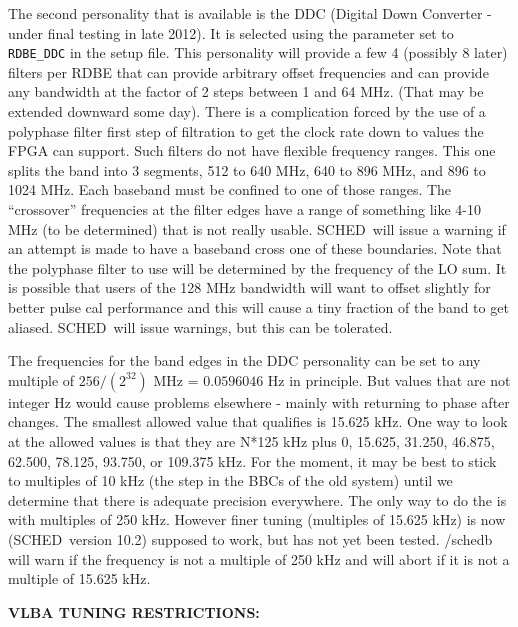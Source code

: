 \documentclass{report}
\newcommand{\schedb}{{\sc SCHED~}}
\begin{document}
The second personality that is available is the DDC (Digital Down
Converter - under final testing in late 2012).  It is selected using
the  parameter set to {\tt RDBE\_DDC} in
the setup file. This personality will provide a few 4 (possibly 8
later) filters per RDBE that can provide arbitrary offset frequencies
and can provide any bandwidth at the factor of 2 steps between 1 and
64 MHz.  (That may be extended downward some day).  There is a
complication forced by the use of a polyphase filter first step of
filtration to get the clock rate down to values the FPGA can support.
Such filters do not have flexible frequency ranges.  This one splits
the band into 3 segments, 512 to 640 MHz, 640 to 896 MHz, and 896 to
1024 MHz.  Each baseband must be confined to one of those ranges.  The
``crossover'' frequencies at the filter edges have a range of
something like 4-10 MHz (to be determined) that is not really usable.
\schedb will issue a warning if an attempt is made to have a baseband
cross one of these boundaries.  Note that the polyphase filter to use
will be determined by the frequency of the LO sum.  It is possible
that users of the 128 MHz bandwidth will want to offset slightly for
better pulse cal performance and this will cause a tiny fraction of
the band to get aliased.  \schedb will issue warnings, but this can be
tolerated.

The frequencies for the band edges in the DDC personality can be set
to any multiple of $256 / (2^{32})$ MHz = $0.0596046$ Hz in principle.
But values that are not integer Hz would cause problems elsewhere -
mainly with returning to phase after changes.  The smallest allowed
value that qualifies is 15.625 kHz.  One way to look at the allowed
values is that they are N*125 kHz plus 0, 15.625, 31.250, 46.875,
62.500, 78.125, 93.750, or 109.375 kHz.  For the moment, it may be
best to stick to multiples of 10 kHz (the step in the BBCs of the old
system) until we determine that there is adequate precision
everywhere.  The only way to do the is with multiples of 250 kHz.
However finer tuning (multiples of 15.625 kHz) is now (\schedb version
10.2) supposed to work, but has not yet been tested.  /schedb will 
warn if the frequency is not a multiple of 250 kHz and will abort if
it is not a multiple of 15.625 kHz.

{\bf VLBA TUNING RESTRICTIONS:}
\end{document}
